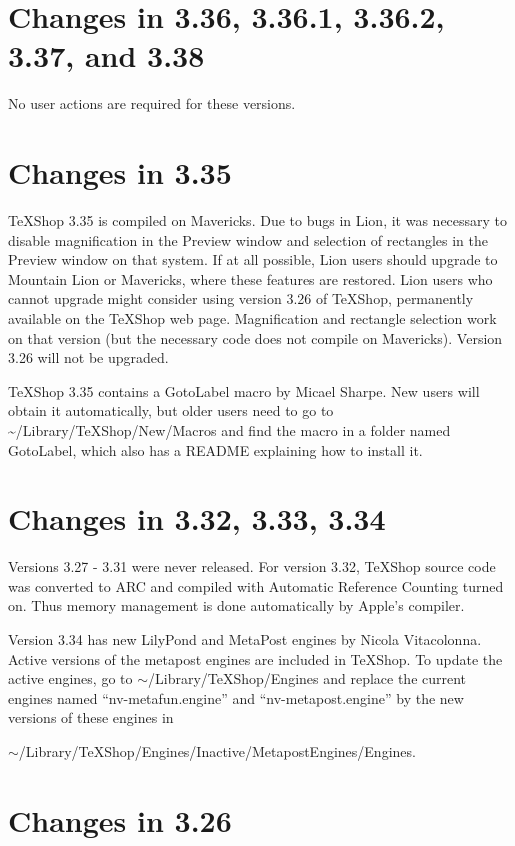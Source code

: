 \documentclass[11pt, oneside]{amsart}
\begin{document}
\section{Changes in 3.36, 3.36.1,  3.36.2, 3.37, and 3.38}

No user actions are required for these versions.

\section{Changes in 3.35}

TeXShop 3.35 is compiled on Mavericks. Due to bugs in Lion, it was necessary to disable magnification in the Preview window and selection of rectangles in the Preview window on that system. If at all possible, Lion users should upgrade to Mountain Lion or Mavericks, where these features are restored. Lion users who cannot
upgrade might consider using version 3.26 of TeXShop, permanently available on the TeXShop web page. Magnification and rectangle selection work on that version (but the necessary code does not compile on Mavericks). Version 3.26 will not be upgraded.

TeXShop 3.35 contains a GotoLabel macro by Micael Sharpe. New users will obtain it automatically, but older users need to go to \textasciitilde/Library/TeXShop/New/Macros
and find the macro in a folder named GotoLabel, which also has a  README explaining how to install it.



\section{Changes in 3.32, 3.33, 3.34}

Versions 3.27 - 3.31 were never released. For version 3.32, TeXShop source code was converted to ARC and compiled with Automatic Reference Counting
turned on. Thus memory management is done automatically by Apple's compiler.

Version 3.34 has new LilyPond and MetaPost engines by Nicola Vitacolonna.  Active versions of the metapost engines are included in TeXShop. To update
the active  engines, go to  $\sim$/Library/TeXShop/Engines and replace the current engines named ``nv-metafun.engine'' and ``nv-metapost.engine'' by the new
versions of these engines in 

\hspace{.5in} $\sim$/Library/TeXShop/Engines/Inactive/MetapostEngines/Engines.

\section{Changes in 3.26}
\end{document}
